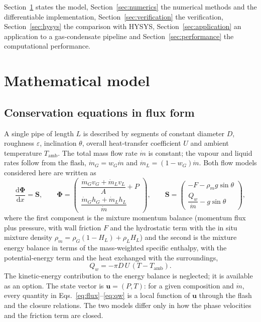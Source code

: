 \documentclass[a4paper,fleqn]{cas-sc}
\newcommand{\mdot}{\dot{m}}
\newcommand{\dd}{\mathrm{d}}
\newcommand{\bPhi}{\boldsymbol{\Phi}}
\newcommand{\bS}{\mathbf{S}}
\newcommand{\bu}{\mathbf{u}}
\begin{document}
Section~\ref{sec:model} states the model, Section~\ref{sec:numerics} the numerical methods and the differentiable implementation, Section~\ref{sec:verification} the verification, Section~\ref{sec:hysys} the comparison with HYSYS, Section~\ref{sec:application} an application to a gas-condensate pipeline and Section~\ref{sec:performance} the computational performance.

\section{Mathematical model}\label{sec:model}

\subsection{Conservation equations in flux form}\label{sec:conservation}

A single pipe of length $L$ is described by segments of constant diameter $D$, roughness $\varepsilon$, inclination $\theta$, overall heat-transfer coefficient $U$ and ambient temperature $T_\mathrm{amb}$. The total mass flow rate $\mdot$ is constant; the vapour and liquid rates follow from the flash, $\mdot_G = w_G\mdot$ and $\mdot_L = (1 - w_G)\mdot$. Both flow models considered here are written as
\begin{equation}\label{eq:flux}
\frac{\dd \bPhi}{\dd x} = \bS, \qquad
\bPhi = \begin{pmatrix} \dfrac{\mdot_G v_G + \mdot_L v_L}{A} + P \\[1.2ex] \dfrac{\mdot_G h_G + \mdot_L h_L}{\mdot} \end{pmatrix}, \qquad
\bS = \begin{pmatrix} -F - \rho_m g \sin\theta \\[0.6ex] \dfrac{Q_w}{\mdot} - g\sin\theta \end{pmatrix},
\end{equation}
where the first component is the mixture momentum balance (momentum flux plus pressure, with wall friction $F$ and the hydrostatic term with the in situ mixture density $\rho_m = \rho_G(1 - H_L) + \rho_L H_L$) and the second is the mixture energy balance in terms of the mass-weighted specific enthalpy, with the potential-energy term and the heat exchanged with the surroundings,
\begin{equation}\label{eq:qw}
Q_w = -\pi D\, U\, (T - T_\mathrm{amb}).
\end{equation}
The kinetic-energy contribution to the energy balance is neglected; it is available as an option. The state vector is $\bu = (P, T)$: for a given composition and $\mdot$, every quantity in Eqs.~\eqref{eq:flux}--\eqref{eq:qw} is a local function of $\bu$ through the flash and the closure relations. The two models differ only in how the phase velocities and the friction term are closed.
\end{document}
